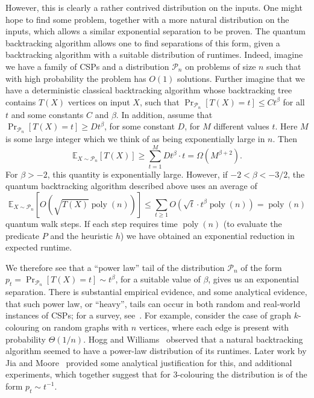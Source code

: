 \documentclass[11pt]{article}
\newcommand{\E}{\mathbb{E}}
\DeclareMathOperator{\poly}{poly}
\begin{document}
However, this is clearly a rather contrived distribution on the inputs. One might hope to find some problem, together with a more natural distribution on the inputs, which allows a similar exponential separation to be proven. The quantum backtracking algorithm allows one to find separations of this form, given a backtracking algorithm with a suitable distribution of runtimes. Indeed, imagine we have a family of CSPs and a distribution $\mathcal{P}_n$ on problems of size $n$ such that with high probability the problem has $O(1)$ solutions. Further imagine that we have a deterministic classical backtracking algorithm whose backtracking tree contains $T(X)$ vertices on input $X$, such that $\Pr_{\mathcal{P}_n}[T(X) = t] \le C t^{\beta}$ for all $t$ and some constants $C$ and $\beta$. In addition, assume that $\Pr_{\mathcal{P}_n}[T(X) = t] \ge D t^{\beta}$, for some constant $D$, for $M$ different values $t$. Here $M$ is some large integer which we think of as being exponentially large in $n$. Then
%
\[ \E_{X \sim \mathcal{P}_n}[T(X)] \ge \sum_{t=1}^{M} D t^{\beta} \cdot t = \Omega(M^{\beta+2}). \]
%
For $\beta > -2$, this quantity is exponentially large. However, if $-2 < \beta < -3/2$, the quantum backtracking algorithm described above uses an average of
%
\[ \E_{X \sim \mathcal{P}_n}[O(\sqrt{T(X)}\poly(n))] \le \sum_{t \ge 1} O(\sqrt{t} \cdot t^{\beta} \poly(n)) = \poly(n) \]
%
quantum walk steps. If each step requires time $\poly(n)$ (to evaluate the predicate $P$ and the heuristic $h$) we have obtained an exponential reduction in expected runtime.

We therefore see that a ``power law'' tail of the distribution $\mathcal{P}_n$ of the form $p_t = \Pr_{\mathcal{P}_n}[T(X) = t] \sim t^{\beta}$, for a suitable value of $\beta$, gives us an exponential separation. There is substantial empirical evidence, and some analytical evidence, that such power law, or ``heavy'', tails can occur in both random and real-world instances of CSPs; for a survey, see~\cite{gomes06}. For example, consider the case of graph $k$-colouring on random graphs with $n$ vertices, where each edge is present with probability $\Theta(1/n)$. Hogg and Williams~\cite{hogg94} observed that a natural backtracking algorithm seemed to have a power-law distribution of its runtimes. Later work by Jia and Moore~\cite{jia04} provided some analytical justification for this, and additional experiments, which together suggest that for 3-colouring the distribution is of the form $p_t \sim t^{-1}$.
\end{document}
